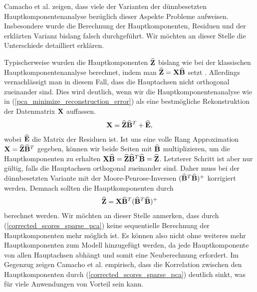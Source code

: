 Camacho et al. zeigen, dass viele der Varianten der dünnbesetzten Hauptkomponentenanalyse bezüglich dieser Aspekte Probleme aufweisen. Insbesondere wurde die Berechnung der Hauptkomponenten, Residuen und der erklärten Varianz bislang falsch durchgeführt. Wir möchten an dieser Stelle die Unterschiede detailliert erklären.

Typischerweise wurden die Hauptkomponenten $\widehat{\mathbf{Z}}$ bislang wie bei der klassischen Hauptkomponentenanalyse berechnet, indem man $\widehat{\mathbf{Z}} = \mathbf{X} \widehat{\mathbf{B}}$ setzt \cite{zou_sparsepca}. Allerdings vernachlässigt man in diesem Fall, dass die Hauptachsen nicht orthogonal zueinander sind. Dies wird deutlich, wenn wir die Hauptkomponentenanalyse wie in (\ref{pca_minimize_reconstruction_error}) als eine bestmögliche Rekonstruktion der Datenmatrix $\mathbf{X}$ auffassen.
\begin{align}
\label{pca_scores_loadings_model}
\mathbf{X} = \widehat{\mathbf{Z}} \widehat{\mathbf{B}}^T + \widehat{\mathbf{E}},
\end{align}
wobei $\widehat{\mathbf{E}}$ die Matrix der Residuen ist. Ist uns eine volle Rang Approximation $\mathbf{X} = \widehat{\mathbf{Z}} \widehat{\mathbf{B}}^T$ gegeben, können wir beide Seiten mit $\widehat{\mathbf{B}}$ multiplizieren, um die Hauptkomponenten zu erhalten $\mathbf{X} \widehat{\mathbf{B}} = \widehat{\mathbf{Z}} \widehat{\mathbf{B}}^T \widehat{\mathbf{B}} = \widehat{\mathbf{Z}}$. Letzterer Schritt ist aber nur gültig, falls die Hauptachsen orthogonal zueinander sind. Daher muss bei der dünnbesetzten Variante mit der Moore-Penrose-Inversen $(\widehat{\mathbf{B}}^T \widehat{\mathbf{B}})^+$ korrigiert werden. Demnach sollten die Hauptkomponenten durch
\begin{align}
\label{corrected_scores_sparse_pca}
\widehat{\mathbf{Z}} = \mathbf{X} \widehat{\mathbf{B}}^T (\widehat{\mathbf{B}}^T \widehat{\mathbf{B}})^+
\end{align}
berechnet werden. Wir möchten an dieser Stelle anmerken, dass durch (\ref{corrected_scores_sparse_pca}) keine sequentielle Berechnung der Hauptkomponenten mehr möglich ist. Es können also nicht ohne weiteres mehr Hauptkomponenten zum Modell hinzugefügt werden, da jede Hauptkomponente von allen Hauptachsen abhängt und somit eine Neuberechnung erfordert. Im Gegenzug zeigen Camacho et al. empirisch, dass die Korrelation zwischen den Hauptkomponenten durch (\ref{corrected_scores_sparse_pca}) deutlich sinkt, was für viele Anwendungen von Vorteil sein kann.

